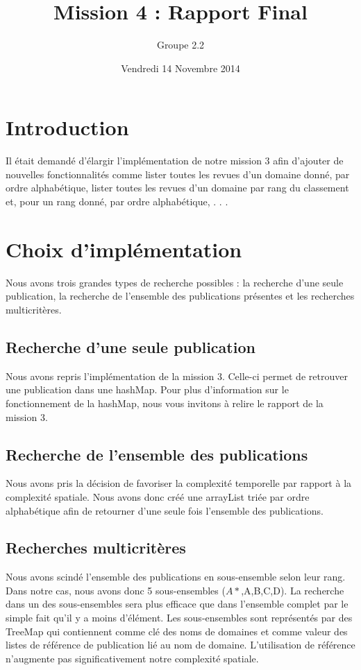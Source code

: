 \documentclass[10pt,a4paper]{article}
\date{Vendredi 14 Novembre 2014}
\author{Groupe 2.2}
\title{Mission 4 : Rapport Final}
\begin{document}
\maketitle
\section*{Introduction}

Il était demandé d'élargir l'implémentation de notre mission 3 afin d'ajouter de nouvelles fonctionnalités comme lister toutes les revues d’un domaine donné,  par ordre alphabétique, lister toutes les revues d’un domaine par rang du classement et, pour un rang donné, par ordre alphabétique, . . .

\section*{Choix d'implémentation}

Nous avons trois grandes types de recherche possibles : la recherche d'une seule publication, la recherche de l'ensemble des publications présentes et les recherches multicritères. 

\subsection*{Recherche d'une seule publication}

Nous avons repris l'implémentation de la mission 3.  Celle-ci permet de retrouver une publication dans une hashMap. Pour plus d'information sur le fonctionnement de la hashMap, nous vous invitons à relire le rapport de la mission 3.

\subsection*{Recherche de l'ensemble des publications} 

Nous avons pris la décision de favoriser la complexité temporelle par rapport à la complexité spatiale. Nous avons donc créé une arrayList triée par ordre alphabétique afin de retourner d'une seule fois l'ensemble des publications.

\subsection*{Recherches multicritères}

Nous avons scindé l'ensemble des publications en sous-ensemble selon leur rang. Dans notre cas, nous avons donc 5 sous-ensembles ($A*$,A,B,C,D). La recherche dans un des sous-ensembles sera plus efficace que dans l'ensemble complet par le simple fait qu'il y a moins d'élément. Les sous-ensembles sont représentés par des TreeMap qui contiennent comme clé des noms de domaines et comme valeur des listes de référence de publication lié au nom de domaine. L'utilisation de référence n'augmente pas significativement notre complexité spatiale.
\end{document}
